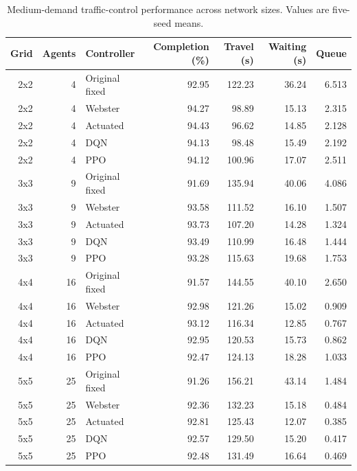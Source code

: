 \begin{table}[htbp]
\centering
\caption{Medium-demand traffic-control performance across network sizes. Values are five-seed means.}
\label{tab:medium_scalability_v2}
\small
\begin{tabular}{rrlrrrr}
\hline
Grid & Agents & Controller & Completion (\%) & Travel (s) & Waiting (s) & Queue \\
\hline
2x2 & 4 & Original fixed & 92.95 & 122.23 & 36.24 & 6.513 \\
2x2 & 4 & Webster & 94.27 & 98.89 & 15.13 & 2.315 \\
2x2 & 4 & Actuated & 94.43 & 96.62 & 14.85 & 2.128 \\
2x2 & 4 & DQN & 94.13 & 98.48 & 15.49 & 2.192 \\
2x2 & 4 & PPO & 94.12 & 100.96 & 17.07 & 2.511 \\
\hline
3x3 & 9 & Original fixed & 91.69 & 135.94 & 40.06 & 4.086 \\
3x3 & 9 & Webster & 93.58 & 111.52 & 16.10 & 1.507 \\
3x3 & 9 & Actuated & 93.73 & 107.20 & 14.28 & 1.324 \\
3x3 & 9 & DQN & 93.49 & 110.99 & 16.48 & 1.444 \\
3x3 & 9 & PPO & 93.28 & 115.63 & 19.68 & 1.753 \\
\hline
4x4 & 16 & Original fixed & 91.57 & 144.55 & 40.10 & 2.650 \\
4x4 & 16 & Webster & 92.98 & 121.26 & 15.02 & 0.909 \\
4x4 & 16 & Actuated & 93.12 & 116.34 & 12.85 & 0.767 \\
4x4 & 16 & DQN & 92.95 & 120.53 & 15.73 & 0.862 \\
4x4 & 16 & PPO & 92.47 & 124.13 & 18.28 & 1.033 \\
\hline
5x5 & 25 & Original fixed & 91.26 & 156.21 & 43.14 & 1.484 \\
5x5 & 25 & Webster & 92.36 & 132.23 & 15.18 & 0.484 \\
5x5 & 25 & Actuated & 92.81 & 125.43 & 12.07 & 0.385 \\
5x5 & 25 & DQN & 92.57 & 129.50 & 15.20 & 0.417 \\
5x5 & 25 & PPO & 92.48 & 131.49 & 16.64 & 0.469 \\
\hline
\end{tabular}
\end{table}

